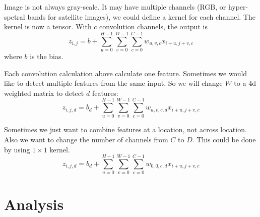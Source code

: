 \begin{example}
    Image is not always gray-scale. It may have multiple channels (RGB, or hyper-spetral bands for satellite images), we could define a kernel for each channel. The kernel is now a tensor. With $c$ convolution channels, the output is
\begin{equation}
    z_{i,j} = b + \sum_{u=0}^{H-1} \sum_{v=0}^{W-1} \sum_{c=0}^{C-1} w_{u,v,c} x_{i+u,j+v,c}
\end{equation}
    where $b$ is the bias.
\end{example}


\begin{example}
    Each convolution calculation above calculate one feature. Sometimes we would like to detect multiple features from the same input. So we will change $W$ to a $4$d weighted matrix to detect $d$ features:
    \begin{equation}
        z_{i,j,d} = b_d + \sum_{u=0}^{H-1} \sum_{v=0}^{W-1} \sum_{c=0}^{C-1} w_{u,v,c,d} x_{i+u,j+v,c}
    \end{equation}
\end{example}

\begin{example}
    Sometimes we just want to combine features at a location, not across location. Also we want to change the number of channels from $C$ to $D$. This could be done by using $1 \times 1$ kernel.
    \begin{equation}
        z_{i,j,d} = b_d + \sum_{u=0}^{H-1} \sum_{v=0}^{W-1} \sum_{c=0}^{C-1} w_{0,0,c,d} x_{i+u,j+v,c}
    \end{equation}
\end{example}





\section{Analysis}

